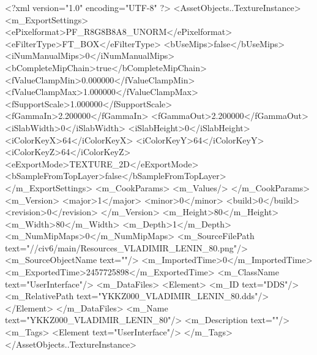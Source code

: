 <?xml version="1.0" encoding="UTF-8" ?>
<AssetObjects..TextureInstance>
	<m_ExportSettings>
		<ePixelformat>PF_R8G8B8A8_UNORM</ePixelformat>
		<eFilterType>FT_BOX</eFilterType>
		<bUseMips>false</bUseMips>
		<iNumManualMips>0</iNumManualMips>
		<bCompleteMipChain>true</bCompleteMipChain>
		<fValueClampMin>0.000000</fValueClampMin>
		<fValueClampMax>1.000000</fValueClampMax>
		<fSupportScale>1.000000</fSupportScale>
		<fGammaIn>2.200000</fGammaIn>
		<fGammaOut>2.200000</fGammaOut>
		<iSlabWidth>0</iSlabWidth>
		<iSlabHeight>0</iSlabHeight>
		<iColorKeyX>64</iColorKeyX>
		<iColorKeyY>64</iColorKeyY>
		<iColorKeyZ>64</iColorKeyZ>
		<eExportMode>TEXTURE_2D</eExportMode>
		<bSampleFromTopLayer>false</bSampleFromTopLayer>
	</m_ExportSettings>
	<m_CookParams>
		<m_Values/>
	</m_CookParams>
	<m_Version>
		<major>1</major>
		<minor>0</minor>
		<build>0</build>
		<revision>0</revision>
	</m_Version>
	<m_Height>80</m_Height>
	<m_Width>80</m_Width>
	<m_Depth>1</m_Depth>
	<m_NumMipMaps>0</m_NumMipMaps>
	<m_SourceFilePath text="//civ6/main/Resources_VLADIMIR_LENIN_80.png"/>
	<m_SourceObjectName text=""/>
	<m_ImportedTime>0</m_ImportedTime>
	<m_ExportedTime>2457725898</m_ExportedTime>
	<m_ClassName text="UserInterface"/>
	<m_DataFiles>
		<Element>
			<m_ID text="DDS"/>
			<m_RelativePath text="YKKZ000_VLADIMIR_LENIN_80.dds"/>
		</Element>
	</m_DataFiles>
	<m_Name text="YKKZ000_VLADIMIR_LENIN_80"/>
	<m_Description text=""/>
	<m_Tags>
		<Element text="UserInterface"/>
	</m_Tags>
</AssetObjects..TextureInstance>

